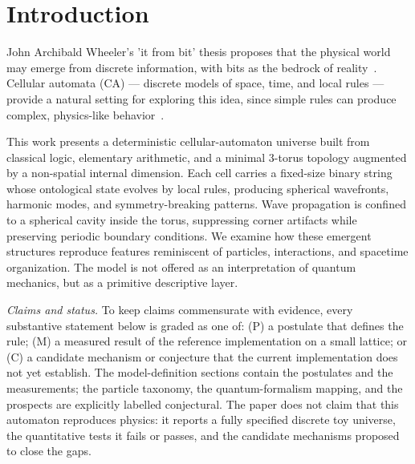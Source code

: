 \documentclass{ijuc}
\begin{document}
\section{Introduction}
John Archibald Wheeler's 'it from bit' thesis proposes that the physical world may emerge from discrete information, with bits as the bedrock of reality~\cite{wheeler}. Cellular automata (CA) --- discrete models of space, time, and local rules --- provide a natural setting for exploring this idea, since simple rules can produce complex, physics-like behavior~\cite{wolfram,zuse,fredkin}.

This work presents a deterministic cellular-automaton universe built from classical logic, elementary arithmetic, and a minimal 3-torus topology augmented by a non-spatial internal dimension. Each cell carries a fixed-size binary string whose ontological state evolves by local rules, producing spherical wavefronts, harmonic modes, and symmetry-breaking patterns. Wave propagation is confined to a spherical cavity inside the torus, suppressing corner artifacts while preserving periodic boundary conditions. We examine how these emergent structures reproduce features reminiscent of particles, interactions, and spacetime organization. The model is not offered as an interpretation of quantum mechanics, but as a primitive descriptive layer.

\emph{Claims and status.} To keep claims commensurate with evidence, every substantive statement below is graded as one of: (P) a postulate that defines the rule; (M) a measured result of the reference implementation on a small lattice; or (C) a candidate mechanism or conjecture that the current implementation does not yet establish.  The model-definition sections contain the postulates and the measurements; the particle taxonomy, the quantum-formalism mapping, and the prospects are explicitly labelled conjectural.  The paper does not claim that this automaton reproduces physics: it reports a fully specified discrete toy universe, the quantitative tests it fails or passes, and the candidate mechanisms proposed to close the gaps.
\end{document}
